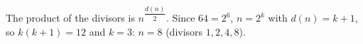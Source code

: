 The product of the divisors is $n^{\dfrac{d(n)}2}$. Since $64=2^6$, $n=2^k$ with $d(n)=k+1$, so $k(k+1)=12$ and $k=3$: $n=\boxed{8}$ (divisors $1,2,4,8$).
